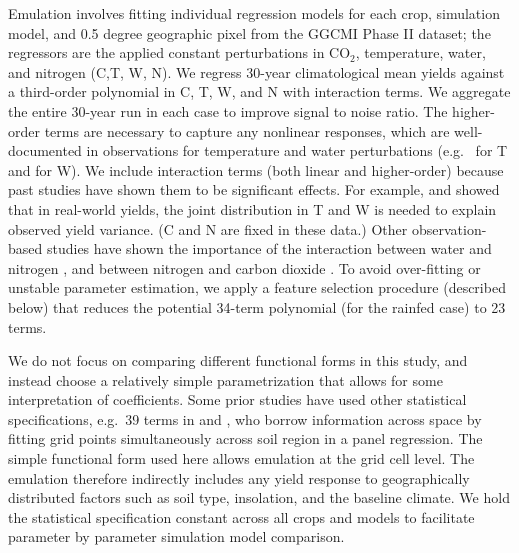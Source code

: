 \documentclass[esd, manuscript]{copernicus} %
\begin{document}
Emulation involves fitting individual regression models for each crop, simulation model, and 0.5 degree geographic pixel from the GGCMI Phase II dataset; the regressors are the applied constant perturbations in CO$_2$, temperature, water, and nitrogen (C,T, W, N).  We regress 30-year climatological mean yields against a third-order polynomial in C, T, W, and N with interaction terms. We aggregate the entire 30-year run in each case to improve signal to noise ratio. The higher-order terms are necessary to capture any nonlinear responses, which are well-documented in observations for temperature and water perturbations (e.g.\ \citet{Schlenker2009} for T and \citet{He2016} for W). We include interaction terms (both linear and higher-order) because past studies have shown them to be significant effects. For example, \citet{Lobell2007} and \citet{Tebaldi2008} showed that in real-world yields, the joint distribution in T and W is needed to explain observed yield variance. (C and N are fixed in these data.) Other observation-based studies have shown the importance of the interaction between water and nitrogen \citep[e.g.][]{AULAKH2005}, and between nitrogen and carbon dioxide \citep{Mitsuru92, Nakamura97}. To avoid over-fitting or unstable parameter estimation, we apply a feature selection procedure (described below) that reduces the potential 34-term polynomial (for the rainfed case) to 23 terms.

We do not focus on comparing different functional forms in this study, and instead choose a relatively simple parametrization that allows for some interpretation of coefficients. Some prior studies have used other statistical specifications, e.g.\ 39 terms in \citet{BLANC2015} and \citet{BLANC2017}, who borrow information across space by fitting grid points simultaneously across soil region in a panel regression. The simple functional form used here allows emulation at the grid cell level. The emulation therefore indirectly includes any yield response to geographically distributed factors such as soil type, insolation, and the baseline climate. We hold the statistical specification constant across all crops and models to facilitate parameter by parameter simulation model comparison.
\end{document}
